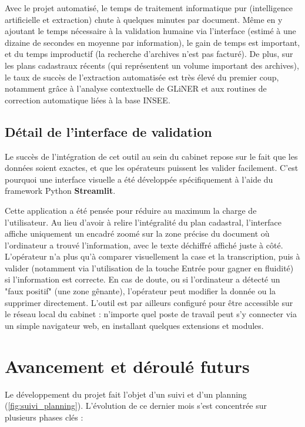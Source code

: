 \documentclass[a4paper,11pt]{article}
\begin{document}
Avec le projet automatisé, le temps de traitement informatique pur (intelligence artificielle et extraction) chute à quelques minutes par document. Même en y ajoutant le temps nécessaire à la validation humaine via l'interface (estimé à une dizaine de secondes en moyenne par information), le gain de temps est important, et du temps improductif (la recherche d'archives n'est pas facturé). De plus, sur les plans cadastraux récents (qui représentent un volume important des archives), le taux de succès de l'extraction automatisée est très élevé du premier coup, notamment grâce à l'analyse contextuelle de GLiNER et aux routines de correction automatique liées à la base INSEE.

\subsection{Détail de l'interface de validation }
Le succès de l'intégration de cet outil au sein du cabinet repose sur le fait que les données soient exactes, et que les opérateurs puissent les valider facilement. C'est pourquoi une interface visuelle a été développée spécifiquement à l'aide du framework Python \textbf{Streamlit}. 

Cette application a été pensée pour réduire au maximum la charge de l'utilisateur. Au lieu d'avoir à relire l'intégralité du plan cadastral, l'interface affiche uniquement un encadré zoomé sur la zone précise du document où l'ordinateur a trouvé l'information, avec le texte déchiffré affiché juste à côté. L'opérateur n'a plus qu'à comparer visuellement la case et la transcription, puis à valider (notamment via l'utilisation de la touche Entrée pour gagner en fluidité) si l'information est correcte. En cas de doute, ou si l'ordinateur a détecté un "faux positif" (une zone gênante), l'opérateur peut modifier la donnée ou la supprimer directement. L'outil est par ailleurs configuré pour être accessible sur le réseau local du cabinet : n'importe quel poste de travail peut s'y connecter via un simple navigateur web, en installant quelques extensions et modules.

\section{Avancement et déroulé futurs}

Le développement du projet fait l'objet d'un suivi et d'un planning (\ref{fig:suivi_planning}). L'évolution de ce dernier mois s'est concentrée sur plusieurs phases clés :
\end{document}
